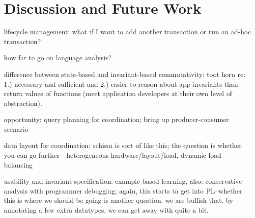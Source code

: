 
\section{Discussion and Future Work}
\label{sec:discussion}

lifecycle management: what if I want to add another transaction or run
an ad-hoc transaction?

how far to go on language analysis?

difference between state-based and invariant-based commutativity: toot
horn re: 1.) necessary and sufficient and 2.) easier to reason about
app invariants than return values of functions (meet application
developers at their own level of abstraction).

opportunity: query planning for coordination; bring up
producer-consumer scenario

data layout for coordination: schism is sort of like this; the
question is whether you can go further---heterogeneous
hardware/layout/load, dynamic load balancing

usability and invariant specification: example-based learning, also:
conservative analysis with programmer debugging; again, this starts to
get into PL--whether this is where we should be going is another
question. we are bullish that, by annotating a few extra datatypes, we
can get away with quite a bit.

